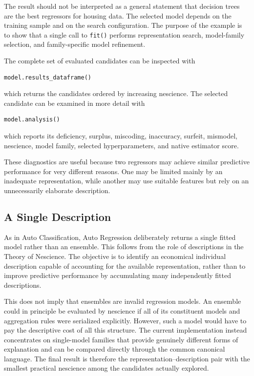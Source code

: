 The result should not be interpreted as a general statement that decision trees are the best regressors for housing data. The selected model depends on the training sample and on the search configuration. The purpose of the example is to show that a single call to \texttt{fit()} performs representation search, model-family selection, and family-specific model refinement.

The complete set of evaluated candidates can be inspected with

\begin{sourcecode}
{\scriptsize
\begin{verbatim}
model.results_dataframe()
\end{verbatim}}
\end{sourcecode}

which returns the candidates ordered by increasing nescience. The selected candidate can be examined in more detail with

\begin{sourcecode}
{\scriptsize
\begin{verbatim}
model.analysis()
\end{verbatim}}
\end{sourcecode}

which reports its deficiency, surplus, miscoding, inaccuracy, surfeit, mismodel, nescience, model family, selected hyperparameters, and native estimator score.

These diagnostics are useful because two regressors may achieve similar predictive performance for very different reasons. One may be limited mainly by an inadequate representation, while another may use suitable features but rely on an unnecessarily elaborate description.


\subsection*{A Single Description}

As in Auto Classification, Auto Regression deliberately returns a single fitted model rather than an ensemble. This follows from the role of descriptions in the Theory of Nescience. The objective is to identify an economical individual description capable of accounting for the available representation, rather than to improve predictive performance by accumulating many independently fitted descriptions.

This does not imply that ensembles are invalid regression models. An ensemble could in principle be evaluated by nescience if all of its constituent models and aggregation rules were serialized explicitly. However, such a model would have to pay the descriptive cost of all this structure. The current implementation instead concentrates on single-model families that provide genuinely different forms of explanation and can be compared directly through the common canonical language. The final result is therefore the representation--description pair with the smallest practical nescience among the candidates actually explored.

